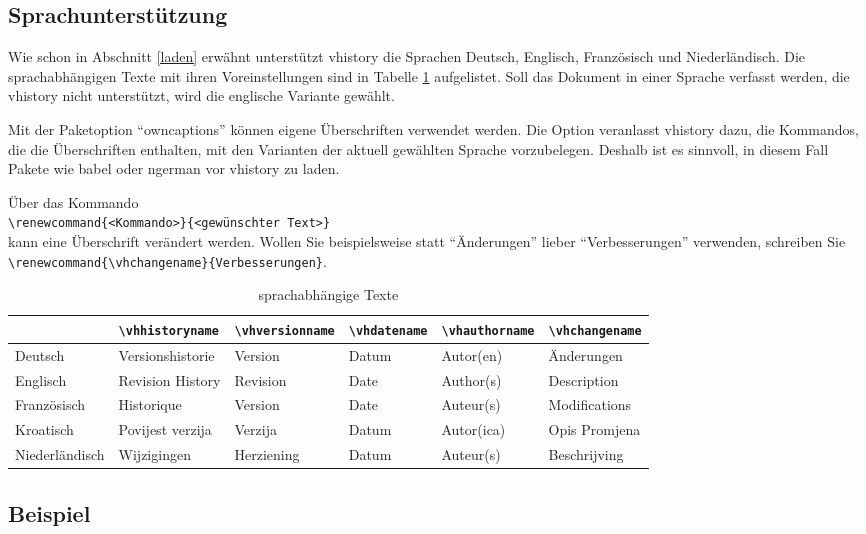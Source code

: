 \subsection{Sprachunterstützung}\label{sprachen}
Wie schon in Abschnitt \ref{laden} erwähnt unterstützt vhistory die Sprachen Deutsch, Englisch, Französisch und Niederländisch. Die sprachabhängigen Texte mit ihren Voreinstellungen sind in Tabelle \ref{tab:sprachen} aufgelistet. Soll das Dokument in einer Sprache verfasst werden, die vhistory nicht unterstützt, wird die englische Variante gewählt.

Mit der Paketoption "`owncaptions"' können eigene Überschriften verwendet werden. Die Option veranlasst vhistory dazu, die Kommandos, die die Überschriften enthalten, mit den Varianten der aktuell gewählten Sprache vorzubelegen. Deshalb ist es sinnvoll, in diesem Fall Pakete wie babel oder ngerman vor vhistory zu laden.

Über das Kommando\\
\mbox{}\hspace{2em}\verb|\renewcommand{<Kommando>}{<gewünschter Text>}|\\
kann eine Überschrift verändert werden. Wollen Sie beispielsweise statt "`Änderungen"' lieber "`Verbesserungen"' verwenden, schreiben Sie\\
\mbox{}\hspace{2em}\verb|\renewcommand{\vhchangename}{Verbesserungen}|.

\begin{table}%
\begin{center}
\begin{scriptsize}
\begin{tabular}{llllll}\hline
& \verb|\vhhistoryname| & \verb|\vhversionname| & \verb|\vhdatename| & \verb|\vhauthorname| & \verb|\vhchangename|\\ \hline
Deutsch & Versionshistorie & Version & Datum & Autor(en) & Änderungen\\
Englisch & Revision History & Revision & Date & Author(s) & Description\\
Französisch & Historique & Version & Date & Auteur(s) & Modifications\\
Kroatisch & Povijest verzija & Verzija & Datum & Autor(ica) & Opis Promjena\\
Niederländisch & Wijzigingen & Herziening & Datum & Auteur(s) & Beschrijving\\ \hline
\end{tabular}
\end{scriptsize}
\caption{sprachabhängige Texte}
\label{tab:sprachen}
\end{center}
\end{table}

\subsection{Beispiel}

